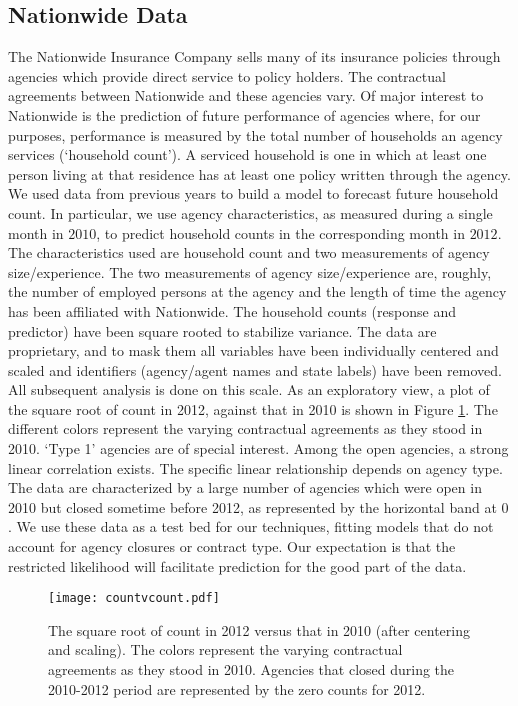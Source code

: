 \documentclass[12pt]{article}
\begin{document}
\subsection{Nationwide Data}
The Nationwide Insurance Company sells many of its insurance policies through agencies which provide direct service to policy holders.  
The contractual agreements between Nationwide and these agencies vary.  Of major interest to Nationwide is the prediction of future performance of agencies where, for our purposes,  performance is measured by the total number of households an agency services (`household count'). A serviced household is one in which at least one person living at that residence has at least one policy written through the agency. We used data from previous years to build a model to forecast future household count. In particular, we use agency characteristics, as measured during a single month in $2010$, to predict household counts in the corresponding month in $2012$. The characteristics used are household count and two measurements of agency size/experience. The two measurements of agency size/experience are, roughly, the number of employed persons at the agency and the length of time the agency has been affiliated with Nationwide. The household counts (response and predictor) have been square rooted to stabilize variance. The data are 
proprietary, and to mask them all variables have been individually centered and scaled and identifiers (agency/agent names and state
labels) have been removed. 
All subsequent analysis is done on this scale.  As an exploratory view, a plot of the square root of count in 2012, against that in 2010 
is shown in Figure \ref{fig:ctVct}.  The different colors represent the varying contractual agreements as they stood in 2010. `Type 1' agencies are of special interest.  Among the open agencies, a strong linear correlation exists.  The specific linear relationship
depends on agency type. The data are characterized by a large number of agencies which were open in 2010 but closed sometime before 2012, as represented by the horizontal band at $0$. We use these data as a test bed for our techniques, fitting models that do not account for agency closures or contract type.  Our expectation is that the restricted likelihood will facilitate prediction for the good part of the data.  

\begin{figure}[t]
\centering
\texttt{[image: countvcount.pdf]}
\caption{The square root of count in 2012 versus that in 2010 (after centering and scaling). The colors represent the varying contractual agreements as they stood in 2010.  Agencies that closed during the 2010-2012 period are represented by the zero counts for 2012.}
\label{fig:ctVct}
\end{figure}
\end{document}
